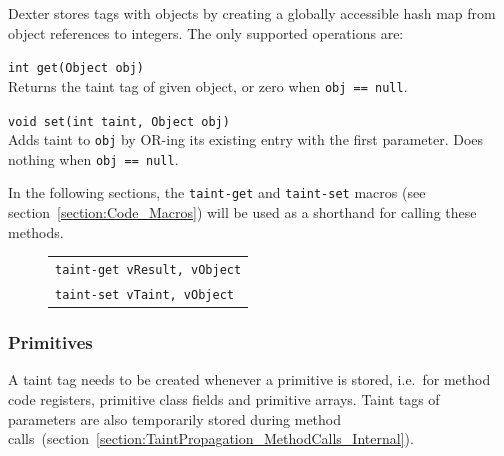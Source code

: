 \documentclass[12pt,twoside,notitlepage]{report}
\newcommand{\centerbox}[1] {
	\begin{center}
	\begin{footnotesize}
	\begin{tabular}{l}
		#1
	\end{tabular}
	\end{footnotesize}
	\end{center}
}
\newcommand{\asm}[1] {\texttt{#1}}
\begin{document}
Dexter stores tags with objects by creating a globally accessible hash map from object references to integers. The only supported operations are:
\begin{description} 
\item \verb$int get(Object obj)$ \\
Returns the taint tag of given object, or zero when \verb$obj == null$.
\item \verb$void set(int taint, Object obj)$ \\
Adds taint to \verb$obj$ by OR-ing its existing entry with the first parameter. Does nothing when \verb$obj == null$.
\end{description}

In the following sections, the \verb$taint-get$ and \verb$taint-set$ macros (see section~\ref{section:Code_Macros}) will be used as a shorthand for calling these methods. 
	\begin{figure}[H]
		\centerbox{
			\asm{taint-get vResult, vObject} \\
			\asm{taint-set vTaint, vObject}
		}
	\end{figure}

\subsubsection{Primitives}

\label{section:TaintStorage_Primitives}

A taint tag needs to be created whenever a primitive is stored, i.e.\ for method code registers, primitive class fields and primitive arrays. Taint tags of parameters are also temporarily stored during method calls~(section~\ref{section:TaintPropagation_MethodCalls_Internal}).
\end{document}
